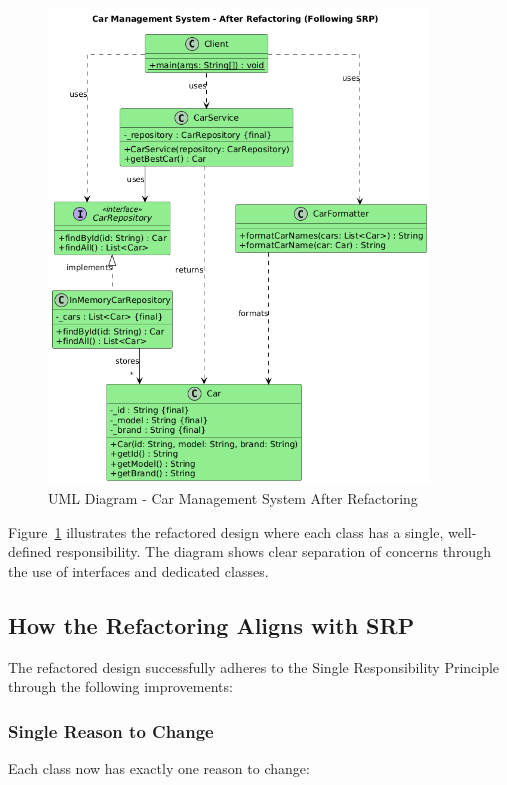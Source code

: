 \begin{figure}[H]
    \centering
    \includegraphics[width=0.9\textwidth]{SRP/plantUML/after.png}
    \caption{UML Diagram - Car Management System After Refactoring}
    \label{fig:srp_after}
\end{figure}

Figure~\ref{fig:srp_after} illustrates the refactored design where each class has a single, well-defined responsibility. The diagram shows clear separation of concerns through the use of interfaces and dedicated classes.

\subsection{How the Refactoring Aligns with SRP}

The refactored design successfully adheres to the Single Responsibility Principle through the following improvements:

\subsubsection{Single Reason to Change}

Each class now has exactly one reason to change:

